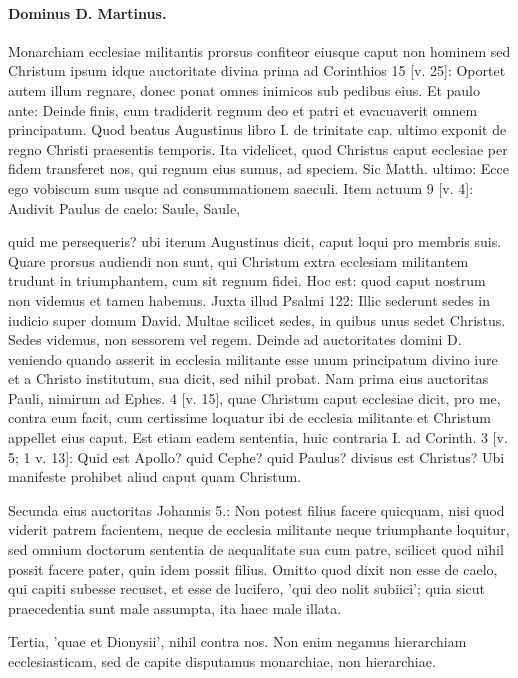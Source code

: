 \paragraph*{Dominus D. Martinus.}

Monarchiam ecclesiae militantis prorsus confiteor eiusque caput non hominem sed Christum ipsum idque auctoritate divina prima ad Corinthios 15 [v. 25]: Oportet autem illum regnare, donec ponat omnes inimicos sub pedibus eius. Et paulo ante: Deinde finis, cum tradiderit regnum deo et patri et evacuaverit omnem principatum. Quod beatus Augustinus libro I. de trinitate cap. ultimo exponit de regno Christi praesentis temporis. Ita videlicet, quod Christus caput ecclesiae per fidem transferet nos, qui regnum eius sumus, ad speciem. Sic Matth. ultimo: Ecce ego vobiscum sum usque ad consummationem saeculi. Item actuum 9 [v. 4]: Audivit Paulus de caelo: Saule, Saule,

quid me persequeris? ubi iterum Augustinus dicit, caput loqui pro membris suis. Quare prorsus audiendi non sunt, qui Christum extra ecclesiam militantem trudunt in triumphantem, cum sit regnum fidei. Hoc est: quod caput nostrum non videmus et tamen habemus. Juxta illud Psalmi 122: Illic sederunt sedes in iudicio super domum David. Multae scilicet sedes, in quibus unus sedet Christus. Sedes videmus, non sessorem vel regem. Deinde ad auctoritates domini D. veniendo quando asserit in ecclesia militante esse unum principatum divino iure et a Christo institutum, sua dicit, sed nihil probat. Nam prima eius auctoritas Pauli, nimirum ad Ephes. 4 [v. 15], quae Christum caput ecclesiae dicit, pro me, contra eum facit, cum certissime loquatur ibi de ecclesia militante et Christum appellet eius caput. Est etiam eadem sententia, huic contraria I. ad Corinth. 3 [v. 5; 1 v. 13]: Quid est Apollo? quid Cephe? quid Paulus? divisus est Christus? Ubi manifeste prohibet aliud caput quam Christum.

Secunda eius auctoritas Johannis 5.: Non potest filius facere quicquam, nisi quod viderit patrem facientem, neque de ecclesia militante neque triumphante loquitur, sed omnium doctorum sententia de aequalitate sua cum patre, scilicet quod nihil possit facere pater, quin idem possit filius. Omitto quod dixit non esse de caelo, qui capiti subesse recuset, et esse de lucifero, 'qui deo nolit subiici'; quia sicut praecedentia sunt male assumpta, ita haec male illata.

Tertia, 'quae et Dionysii', nihil contra nos. Non enim negamus hierarchiam ecclesiasticam, sed de capite disputamus monarchiae, non hierarchiae.

